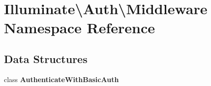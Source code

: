 \section{Illuminate\textbackslash{}Auth\textbackslash{}Middleware Namespace Reference}
\label{namespace_illuminate_1_1_auth_1_1_middleware}
\subsection*{Data Structures}
\begin{DoxyCompactItemize}
\item 
class {\bf Authenticate\+With\+Basic\+Auth}
\end{DoxyCompactItemize}
